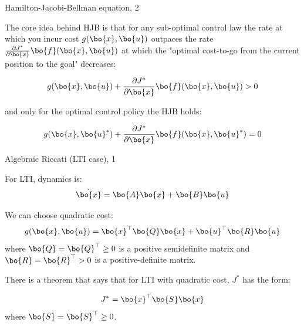\documentclass{beamer}
\begin{document}
\begin{frame}{Hamilton-Jacobi-Bellman equation, 2}
	\begin{flushleft}
		
		The core idea behind HJB is that for any sub-optimal control law the rate at which you incur cost $g(\bo{x}, \bo{u})$ outpaces the rate $\frac{\partial J^*}{\partial \bo{x}} \bo{f} (\bo{x}, \bo{u})$  at which the "optimal cost-to-go from the current position to the goal" decreases: 
		
		\begin{equation}
		g(\bo{x}, \bo{u}) + 
		\frac{\partial J^*}{\partial \bo{x}} \bo{f} (\bo{x}, \bo{u}) > 0
		\end{equation}
		
		and only for the optimal control policy the HJB holds:
		
		\begin{equation}
			g(\bo{x}, \bo{u}^*) + 
			\frac{\partial J^*}{\partial \bo{x}} \bo{f} (\bo{x}, \bo{u}^*) 
			= 0
		\end{equation}
		
	\end{flushleft}
\end{frame}




\begin{frame}{Algebraic Riccati (LTI case), 1}
\begin{flushleft}

For LTI, dynamics is:
\begin{equation}
\dot {\bo{x}} = \bo{A}  \bo{x} + \bo{B} \bo{u}
\end{equation}

We can choose quadratic cost:
\begin{equation}
g(\bo{x}, \bo{u} ) = 
\bo{x}^\top \bo{Q} \bo{x} +
\bo{u} ^\top \bo{R} \bo{u} 
\end{equation}
%
where $\bo{Q} = \bo{Q}^\top \geq 0 $ is a positive semidefinite matrix and $\bo{R} = \bo{R}^\top > 0$ is a positive-definite matrix.

\bigskip

There is a theorem that says that for LTI with quadratic cost, $J^*$ has the form:

\begin{equation}
	J^* = \bo{x}^\top \bo{S} \bo{x}
\end{equation}
%
where $\bo{S} = \bo{S}^\top \geq 0$.


\end{flushleft}
\end{frame}
\end{document}
